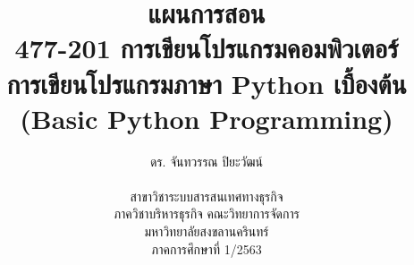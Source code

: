 \documentclass[14pt,a4paper]{extbook}
\begin{document}

\frontmatter
\title{
แผนการสอน\\
477-201 การเขียนโปรแกรมคอมพิวเตอร์\\
\vspace{1mm}
การเขียนโปรแกรมภาษา Python เบื้องต้น\\
(Basic Python Programming)
}
\author{
ดร. จันทวรรณ ปิยะวัฒน์\\
\vspace{1mm}\\
สาขาวิชาระบบสารสนเทศทางธุรกิจ\\
ภาควิชาบริหารธุรกิจ คณะวิทยาการจัดการ\\
มหาวิทยาลัยสงขลานครินทร์\\
ภาคการศึกษาที่ 1/2563
}
\date{\vspace{1ex}}
\maketitle
%



\mainmatter
%
%
%
%
%
%
%
%
%
%
%

%
%

%
\end{document}
